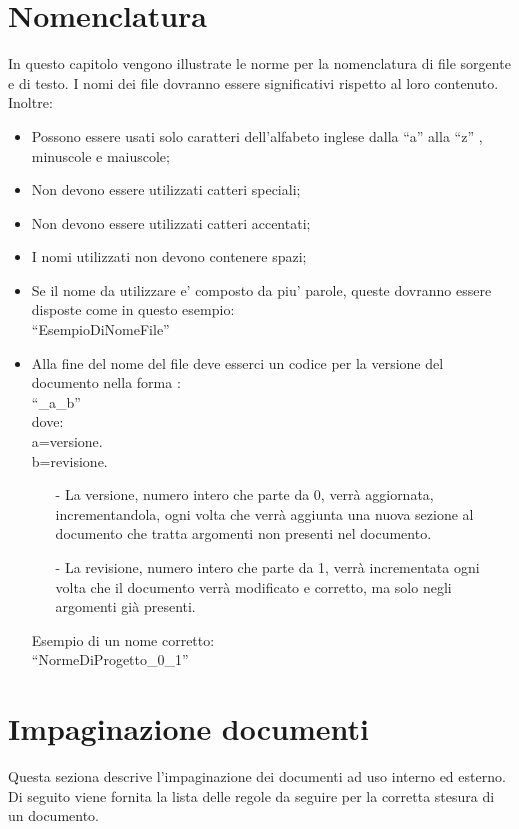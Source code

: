 \documentclass[11pt,titlepage,a4paper]{report}
\begin{document}
\section{Nomenclatura}
In questo capitolo vengono illustrate le norme per la nomenclatura di file sorgente e di testo. I nomi dei file dovranno essere significativi rispetto al loro contenuto. Inoltre:
\begin{itemize}
\item Possono essere usati solo caratteri dell'alfabeto inglese dalla ``a'' alla ``z'' , minuscole e maiuscole;
\item Non devono essere utilizzati catteri speciali;
\item Non devono essere utilizzati catteri accentati;
\item I nomi utilizzati non devono contenere spazi;
\item Se il nome da utilizzare e' composto da piu' parole, queste dovranno essere disposte come in questo esempio: \\
``EsempioDiNomeFile''
\item Alla fine del nome del file deve esserci un codice per la versione del documento nella forma :\\ 
``\_a\_b'' \\
dove:\\
a=versione.\\
b=revisione.\\
\begin{itemize}
\item[-]La versione, numero intero che parte da 0, verr\`a aggiornata, incrementandola, ogni volta che verr\`a aggiunta una nuova sezione al documento che tratta argomenti non presenti nel documento.
\item[-]La revisione, numero intero che parte da 1, verr\`a incrementata ogni volta che il documento verr\`a modificato e corretto, ma solo negli argomenti gi\`a presenti.
\end{itemize} 
Esempio di un nome corretto:\\
``NormeDiProgetto\_0\_1''
\end{itemize}
\section{Impaginazione documenti}
Questa seziona descrive l'impaginazione dei documenti ad uso interno ed esterno. Di seguito viene fornita la lista delle regole da seguire per la corretta stesura di un documento.
\end{document}
